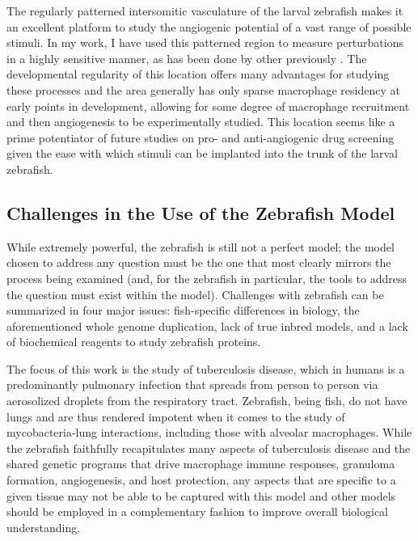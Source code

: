 The regularly patterned intersomitic vasculature of the larval zebrafish makes it an excellent platform to study the angiogenic potential of a vast range of possible stimuli. In my work, I have used this patterned region to measure perturbations in a highly sensitive manner, as has been done by other previously \citep{Oehlers2015, Walton2018}. The developmental regularity of this location offers many advantages for studying these processes and the area generally has only sparse macrophage residency at early points in development, allowing for some degree of macrophage recruitment and then angiogenesis to be experimentally studied. This location seems like a prime potentiator of future studies on pro\hyp{} and anti\hyp{}angiogenic drug screening given the ease with which stimuli can be implanted into the trunk of the larval zebrafish.

\subsection{Challenges in the Use of the Zebrafish Model}\label{zfchal}

While extremely powerful, the zebrafish is still not a perfect model; the model chosen to address any question must be the one that most clearly mirrors the process being examined (and, for the zebrafish in particular, the tools to address the question must exist within the model). Challenges with zebrafish can be summarized in four major issues: fish\hyp{}specific differences in biology, the aforementioned whole genome duplication, lack of true inbred models, and a lack of biochemical reagents to study zebrafish proteins.

The focus of this work is the study of tuberculosis disease, which in humans is a predominantly pulmonary infection that spreads from person to person via aerosolized droplets from the respiratory tract. Zebrafish, being fish, do not have lungs and are thus rendered impotent when it comes to the study of mycobacteria\hyp{}lung interactions, including those with alveolar macrophages. While the zebrafish faithfully recapitulates many aspects of tuberculosis disease and the shared genetic programs that drive macrophage immune responses, granuloma formation, angiogenesis, and host protection, any aspects that are specific to a given tissue may not be able to be captured with this model and other models should be employed in a complementary fashion to improve overall biological understanding. 

